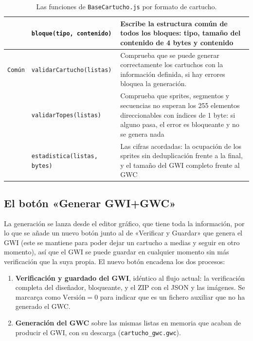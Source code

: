 \begin{table}[H]
\begin{tabularx}{\textwidth}{@{}l l X@{}}
		& \texttt{bloque(tipo, contenido)} & Escribe la estructura común
		de todos los bloques: tipo, tamaño del contenido de 4 bytes y
		contenido \\
		
		\midrule
		\texttt{Común} & \texttt{validarCartucho(listas)}\footnotemark & Comprueba que se puede generar correctamente los cartuchos con la información definida, si hay errores bloquea la generación.\\	
		
		& \texttt{validarTopes(listas)} & Comprueba que sprites, segmentos
		y secuencias no superan los 255 elementos direccionables con
		índices de 1 byte: si alguno pasa, el error es bloqueante y no
		se genera nada \\
		
		& \texttt{estadistica(listas, bytes)} & Las cifras acordadas: la
		ocupación de los sprites sin deduplicación frente a la final, y
		el tamaño del GWI completo frente al GWC \\
		
		\bottomrule
	\end{tabularx}
	\caption{Las funciones de \texttt{BaseCartucho.js} por formato de cartucho.}
	\label{tab:funcionesGenerador}
\end{table}


\subsection{El botón «Generar GWI+GWC»}
\label{sec:F5I3Boton}

La generación se lanza desde el editor gráfico, que tiene toda la información, por lo que se añade un nuevo botón junto al de «Verificar y Guardar» que genera el GWI (este se mantiene para poder dejar un cartucho a medias y seguir en otro momento), así que el GWI se puede guardar en cualquier momento sin más verificación que la suya propia. El nuevo botón encadena los dos procesos:

\begin{enumerate}
	\item \textbf{Verificación y guardado del GWI}, idéntico al flujo actual: la verificación completa del diseñador, bloqueante, y el ZIP con el JSON y las imágenes. Se marcarça como $\text{Versión} = 0$ para indicar que es un fichero auxiliar que no ha generado el GWC.
	
	\item \textbf{Generación del GWC} sobre las mismas listas en 	memoria que acaban de producir el GWI, con su descarga (\texttt{cartucho\_gwc.gwc}).
\end{enumerate}

